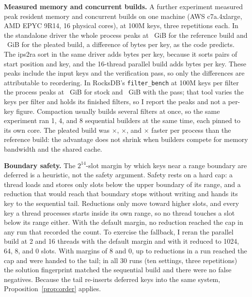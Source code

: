 \documentclass{article}
\begin{document}
\textbf{Measured memory and concurrent builds.} A further experiment measured peak
resident memory and concurrent builds on one machine (AWS c7a.4xlarge, AMD EPYC 9R14, 16 physical
cores), at 100M keys, three repetitions each. In the standalone driver the whole process peaks at
\esixrefrss~GiB for the reference build and \esixpartrss~GiB for the pleated build, a difference of
\esixpartdelta{} bytes per key, as the code predicts. The ips2ra sort in the same driver adds
\esixsortdelta{} bytes per key, because it sorts pairs of start position and key, and the 16-thread
parallel build adds \esixpardelta{} bytes per key. These peaks include the input keys and the verification pass, so
only the differences are attributable to reordering. In RocksDB's \texttt{filter\_bench} at 100M
keys per filter the process peaks at \esixfbstock~GiB for stock and \esixfbpleated~GiB with the pass;
that tool varies the keys per filter and holds its finished filters, so I report the peaks and not
a per-key figure. Compaction usually builds several filters at once, so the same experiment ran 1,
4, and 8 sequential builders at the same time, each pinned to its own core. The pleated build was
\esixratioone$\times$, \esixratiomid$\times$, and \esixratiomax$\times$ faster per process than the
reference build: the advantage does not shrink when builders compete for memory bandwidth and the
shared cache.

\textbf{Boundary safety.} The $2^{14}$-slot margin by which keys near a range boundary are deferred
is a heuristic, not the safety argument. Safety rests on a hard cap: a thread loads and stores only
slots below the upper boundary of its range, and a reduction that would reach that boundary stops
without writing and hands its key to the sequential tail. Reductions only move toward higher slots,
and every key a thread processes starts inside its own range, so no thread touches a slot below its
range either. With the default margin, no reduction reached the cap in any run that recorded the
count. To exercise the fallback, I reran the parallel build at 2 and 16 threads with the default margin
and with it reduced to 1024, 64, 8, and 0 slots. With margins of 8 and 0, up to \esixmaxspill{} reductions in a
run reached the cap and were handed to the tail; in all 30 runs (ten settings, three repetitions) the solution
fingerprint matched the sequential build and there were no false negatives. Because the tail re-inserts deferred keys into
the same system, Proposition~\ref{prop:order} applies.
\end{document}
